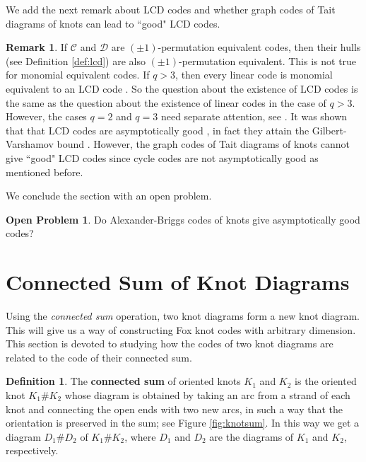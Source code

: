 \documentclass[11pt,a4paper]{article}
\theoremstyle{definition}
\newtheorem{definition}[theorem]{Definition}
\newtheorem{remark}[theorem]{Remark}
\newtheorem{oproblem}[theorem]{Open Problem}
\newcommand{\mC}{\mathcal{C}}
\newcommand{\mD}{\mathcal{D}}
\begin{document}
We add the next remark about LCD codes and whether graph codes of Tait diagrams of knots can lead to ``good" LCD codes.

 
\begin{remark}
If $\mC$ and $\mD$ are $(\pm1)$-permutation equivalent codes, then their hulls (see Definition \ref{def:lcd}) are also $(\pm1)$-permutation equivalent. This is not true for monomial equivalent codes. If $q>3$, then every linear code is monomial equivalent to an LCD code \cite{carlet2018}. 
So the question about the existence of LCD codes is the same as the question about the existence of linear codes in the case of $q>3$. 
However, the cases $q=2$ and $q=3$ need separate attention, see \cite{dougherty2017}. 
It was shown that that LCD codes are asymptotically good \cite{massey1992}, in fact they attain the Gilbert-Varshamov bound \cite{sendrier2004}. However, the graph codes of Tait diagrams of knots cannot give ``good" LCD codes since cycle codes are not asymptotically good as mentioned before. 
\end{remark}

We conclude the section with an open problem. 

\begin{oproblem}
Do Alexander-Briggs codes of knots give asymptotically good
codes?
\end{oproblem}


\section{Connected Sum of Knot Diagrams}
\label{sec:connected}
\label{sec:5}

Using the \textit{connected sum} operation, two knot diagrams form a new knot diagram. This will give us a way 
of constructing Fox knot codes
with arbitrary dimension. 
This section is devoted to studying how the codes of two knot diagrams are related to the code of their connected sum.

\begin{definition}
\label{def:knotsum}
The \textbf{connected sum}
of oriented knots $K_1$ and $K_2$
is the oriented knot $K_1 \# K_2$ 
whose diagram is obtained by taking an arc from a strand of each knot and connecting the open ends with two new arcs, in such a way that the orientation is preserved in the sum; see Figure \ref{fig:knotsum}. In this way we get a diagram $D_1 \# D_2$ of $K_1 \# K_2$, where $D_1$ and $D_2$ are the diagrams of $K_1$ and $K_2$, respectively. \end{definition}
\end{document}
